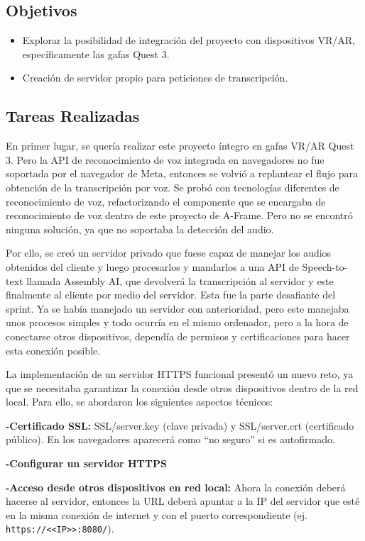 \documentclass[a4paper, 12pt]{book}
\begin{document}
\subsection{Objetivos}
\begin{itemize}
  \item Explorar la posibilidad de integración del proyecto con dispositivos VR/AR, específicamente las gafas Quest 3.
  \item Creación de servidor propio para peticiones de transcripción.
\end{itemize}
\subsection{Tareas Realizadas}

En primer lugar, se quería realizar este proyecto íntegro en gafas VR/AR Quest 3.
Pero la API de reconocimiento de voz integrada en navegadores no fue soportada por el navegador de Meta, entonces se volvió a replantear el flujo para obtención de la transcripción por voz.
Se probó con tecnologías diferentes de reconocimiento de voz, refactorizando el componente que se encargaba de reconocimiento de voz dentro de este proyecto de A-Frame.
Pero no se encontró ninguna solución, ya que no soportaba la detección del audio.

Por ello, se creó un servidor privado que fuese capaz de manejar los audios obtenidos del cliente y luego procesarlos y mandarlos a una API de Speech-to-text llamada Assembly AI, que devolverá la transcripción al servidor y este finalmente al cliente por medio del servidor.
Esta fue la parte desafiante del sprint. Ya se había manejado un servidor con anterioridad, pero este manejaba unos procesos simples y todo ocurría en el mismo ordenador, pero a la hora de conectarse otros dispositivos, dependía de permisos y certificaciones para hacer esta conexión posible.

La implementación de un servidor HTTPS funcional presentó un nuevo reto, ya que se necesitaba garantizar la conexión desde otros dispositivos dentro de la red local. Para ello, se abordaron los siguientes aspectos técnicos:

\textbf{-Certificado SSL:} SSL/server.key (clave privada) y SSL/server.crt (certificado público). En los navegadores aparecerá como “no seguro” si es autofirmado.

\textbf{-Configurar un servidor HTTPS}

\textbf{-Acceso desde otros dispositivos en red local:} Ahora la conexión deberá hacerse al servidor, entonces la URL deberá apuntar a la IP del servidor que esté en la misma conexión de internet y con el puerto correspondiente (ej. \texttt{https://<<IP>>:8080/}).
\end{document}
